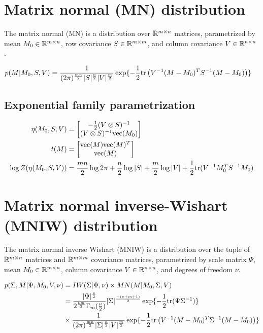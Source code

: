 \section{Matrix normal (MN) distribution}
\label{sec:stats-mn}

The matrix normal (MN) is 
a distribution over $\mathbb{R}^{m \times n}$
matrices, parametrized by 
mean $M_0 \in \mathbb{R}^{m \times n}$,
row covariance $S \in \mathbb{R}^{m \times m}$,
and column covariance $V \in \mathbb{R}^{n \times n}$ .


\begin{align}
        p(M | M_0, S, V) &= \frac{1}{(2\pi)^{\frac{mn}{2}}|S|^{\frac{n}{2}}|V|^{\frac{m}{2}}} \exp{-\frac{1}{2}\tr\left(V^{-1}(M - M_0)^TS^{-1}(M - M_0)\right)}
\end{align}

\subsection*{Exponential family parametrization}
\begin{align*}
    \eta(M_0, S, V) &= \begin{bmatrix}-\frac{1}{2}(V \otimes S)^{-1}\\(V \otimes S)^{-1}\mathrm{vec}(M_0)\end{bmatrix} \\
    t(M) &= \begin{bmatrix}\mathrm{vec}(M)\mathrm{vec}(M)^T\\\mathrm{vec}(M)\end{bmatrix} \\
    \log Z(\eta(M_0, S, V)) &= \frac{mn}{2}\log 2\pi + \frac{n}{2}\log|S| + \frac{m}{2}\log|V| + \frac{1}{2}\mathrm{tr}(V^{-1}M_0^TS^{-1}M_0) 
\end{align*}

\section{Matrix normal inverse-Wishart (MNIW) distribution}
\label{sec:stats-mniw}

The matrix normal inverse Wishart (MNIW) is 
a distribution over the tuple of $\mathbb{R}^{m \times n}$
matrices and $\mathbb{R}^{m \times m}$ covariance matrices, parametrized by 
scale matrix $\Psi$,
mean $M_0 \in \mathbb{R}^{m \times n}$,
column covariance $V \in \mathbb{R}^{n \times n}$,
and degrees of freedom $\nu$.


\begin{align}
        p(\Sigma, M | \Psi, M_0, V, \nu) &= \IW(\Sigma|\Psi, \nu) \times \MN(M|M_0, \Sigma, V) \\
        &= \frac{|\Psi|^{\frac{\nu}{2}}}{2^{\frac{\nu m}{2}}\Gamma_m(\frac{\nu}{2})}|\Sigma|^{\frac{-(\nu + m + 1)}{2}} \exp {-\frac{1}{2}\tr(\Psi\Sigma^{-1})} \\
        &\times \frac{1}{(2\pi)^{\frac{mn}{2}}|\Sigma|^{\frac{n}{2}}|V|^{\frac{m}{2}}} \exp{-\frac{1}{2}\tr\left(V^{-1}(M - M_0)^T\Sigma^{-1}(M - M_0)\right)}
\end{align}

